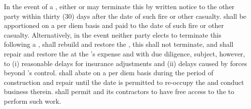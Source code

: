 \label{sec:total-loss}
In the event of a \totalLoss, either \lessor or \lessee may terminate this \lease by written notice to the other party within thirty (30) days after the date of such fire or other casualty. \monthlyRent shall be apportioned on a per diem basis and paid to the date of such fire or other casualty. Alternatively, in the event neither party elects to terminate this \lease following a \totalLoss, \lessor shall rebuild and restore the \building, this \lease shall not terminate, and \lessor shall repair and restore the \premises at the \lessor's expense and with due diligence, subject, however, to (i) reasonable delays for insurance adjustments and (ii) delays caused by forces beyond \lessor's control. \monthlyRent shall abate on a per diem basis during the period of construction and repair until the date \lessee is permitted to re-occupy the \premises and conduct business therein. \lessee shall permit \lessor and its contractors to have free access to the \premises to perform such work.
